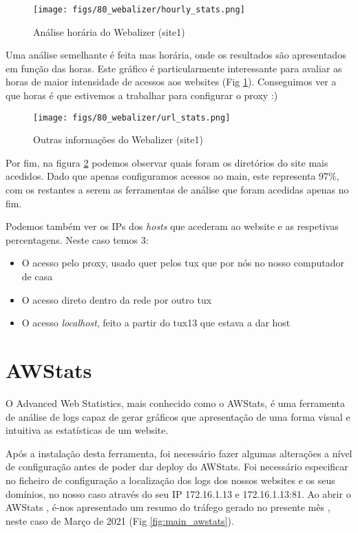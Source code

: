 \begin{figure}
    \centering
    \texttt{[image: figs/80\_webalizer/hourly\_stats.png]}
    \caption{Análise horária do Webalizer (site1)}
    \label{fig:hourly_webalizer}
\end{figure}

Uma análise semelhante é feita mas horária, onde os resultados são apresentados em função das horas.
Este gráfico é particularmente interessante para avaliar as horas de maior intensidade de acessos aos websites (Fig \ref{fig:hourly_webalizer}).
Conseguimos ver a que horas é que estivemos a trabalhar para configurar o proxy :)

\begin{figure}
    \centering
    \texttt{[image: figs/80\_webalizer/url\_stats.png]}
    \caption{Outras informações do Webalizer (site1)}
    \label{fig:url_webalizer}
\end{figure}

Por fim, na figura \ref{fig:url_webalizer} podemos observar quais foram os diretórios do site mais acedidos. Dado que apenas configuramos acessos ao main,
este representa 97\%, com os restantes a serem as ferramentas de análise que foram acedidas apenas no fim.

Podemos também ver os IPs dos \textit{hosts} que acederam ao website e as respetivas percentagens. Neste caso temos 3:
\begin{itemize}
    \item O acesso pelo proxy, usado quer pelos tux que por nós no nosso computador de casa
    \item O acesso direto dentro da rede por outro tux
    \item O acesso \textit{localhost}, feito a partir do tux13 que estava a dar host
\end{itemize}

\section{AWStats}
O Advanced Web Statistics, mais conhecido como o AWStats, é uma ferramenta de análise de logs capaz de gerar gráficos que apresentação de 
uma forma visual e intuitiva as estatísticas de um website.

Após a instalação desta ferramenta, foi necessário fazer algumas alterações a nível de configuração antes de poder dar deploy do AWStats.
Foi necessário especificar no ficheiro de configuração a localização dos logs dos nossos websites e os seus domínios, no nosso caso através do seu IP 172.16.1.13 e 172.16.1.13:81.
Ao abrir o AWStats , é-nos apresentado um resumo do tráfego gerado no presente mês , neste caso de Março de 2021 (Fig \ref{fig:main_awstats}).

